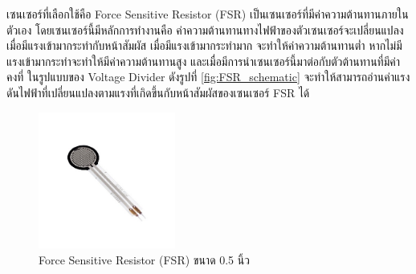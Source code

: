 เซนเซอร์ที่เลือกใช้คือ Force Sensitive Resistor (FSR) เป็นเซนเซอร์ที่มีค่าความต้านทานภายในตัวเอง โดยเซนเซอร์นี้มีหลักการทำงานคือ 
ค่าความต้านทานทางไฟฟ้าของตัวเซนเซอร์จะเปลี่ยนแปลงเมื่อมีแรงเข้ามากระทำกับหน้าสัมผัส เมื่อมีแรงเข้ามากระทำมาก จะทำให้ค่าความต้านทานต่ำ 
หากไม่มีแรงเข้ามากระทำจะทำให้มีค่าความต้านทานสูง และเมื่อมีการนำเซนเซอร์นี้มาต่อกับตัวต้านทานที่มีค่าคงที่ ในรูปแบบของ Voltage Divider 
ดังรูปที่ \ref{fig:FSR_schematic} จะทำให้สามารถอ่านค่าแรงดันไฟฟ้าที่เปลี่ยนแปลงตามแรงที่เกิดขึ้นกับหน้าสัมผัสของเซนเซอร์ FSR ได้ 

\begin{figure}[h!]
  \centering
  \includegraphics[width=0.4\textwidth]{chapter4/images/FSR.jpg}
  \caption{Force Sensitive Resistor (FSR) ขนาด 0.5 นิ้ว}
  \label{fig:FSR}
\end{figure}

